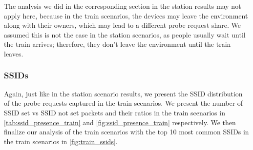 \documentclass[sigconf,nonacm]{acmart}
\begin{document}
The analysis we did in the corresponding section in the station results may not apply here, because in the train scenarios, the devices may leave the environment along with their owners, which may lead to a different probe request share. We assumed this is not the case in the station scenarios, as people usually wait until the train arrives; therefore, they don't leave the environment until the train leaves.

\subsubsection{SSIDs}
\label{sec:part-1/train/ssids}

Again, just like in the station scenario results, we present the SSID distribution of the probe requests captured in the train scenarios. We present the number of SSID set vs SSID not set packets and their ratios in the train scenarios in \cref{tab:ssid_presence_train} and \cref{fig:ssid_presence_train} respectively. We then finalize our analysis of the train scenarios with the top 10 most common SSIDs in the train scenarios in \cref{fig:train_ssids}.

\begin{table}[ht]
    \centering
    \caption{Packet Distribution by SSID Presence in Train Scenarios}
    \label{tab:ssid_presence_train}
\end{table}
\end{document}
